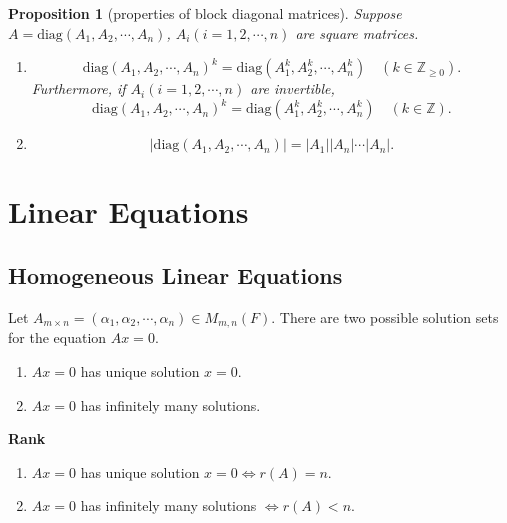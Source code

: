 \documentclass{report}
\newtheorem{proposition}{Proposition}[section]
\theoremstyle{nonumberplain}
\begin{document}
\begin{proposition}[properties of block diagonal matrices]
	Suppose $A=\mathrm{diag}(A_1,A_2,\cdots,A_n)$, $A_i(i=1,2,\cdots,n)$ are square matrices.
	\begin{enumerate}
		\item
		      \[
			      \mathrm{diag}(A_1,A_2,\cdots,A_n)^k=\mathrm{diag}(A_1^k,A_2^k,\cdots,A_n^k)\quad(k\in\mathbb{Z}_{\ge0}).
		      \]
		      Furthermore, if $A_i(i=1,2,\cdots,n)$ are invertible,
		      \[
			      \mathrm{diag}(A_1,A_2,\cdots,A_n)^k=\mathrm{diag}(A_1^k,A_2^k,\cdots,A_n^k)\quad(k\in\mathbb{Z}).
		      \]
		\item
		      \[
			      \left|\mathrm{diag}(A_1,A_2,\cdots,A_n)\right|=\left|A_1\right|\left|A_n\right|\cdots\left|A_n\right|.
		      \]
	\end{enumerate}
\end{proposition}



\section{Linear Equations}
\subsection{Homogeneous Linear Equations}
Let $A_{m\times n}=(\alpha_1,\alpha_2,\cdots,\alpha_n)\in M_{m,n}(F)$. There are two possible solution sets for the equation $Ax=0$.
\begin{enumerate}
	\item $Ax=0$ has unique solution $x=0$.
	\item $Ax=0$ has infinitely many solutions.
\end{enumerate}

\noindent\textbf{Rank}
\begin{enumerate}
	\item $Ax=0$ has unique solution $x=0\iff r(A)=n$.
	\item $Ax=0$ has infinitely many solutions $\iff r(A)<n$.
\end{enumerate}
\end{document}
